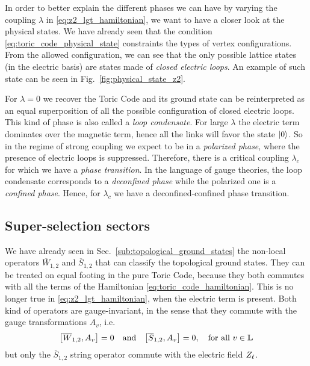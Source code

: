 In order to better explain the different phases we can have by varying the coupling $\lambda$ in \eqref{eq:z2_lgt_hamiltonian}, we want to have a closer look at the physical states.
We have already seen that the condition \eqref{eq:toric_code_physical_state} constraints the types of vertex configurations.
From the allowed configuration, we can see that the only possible lattice states (in the electric basis) are states made of \emph{closed electric loops}.
An example of such state can be seen in Fig.~\ref{fig:physical_state_z2}.


\begin{figure}[t]
\end{figure}


For $\lambda = 0$ we recover the Toric Code and its ground state can be reinterpreted as an equal superposition of all the possible configuration of closed electric loops.
This kind of phase is also called a \emph{loop condensate}.
For large $\lambda$ the electric term dominates over the magnetic term, hence all the links will favor the state $\ket{0}$.
So in the regime of strong coupling we expect to be in a \emph{polarized phase}, where the presence of electric loops is suppressed.
Therefore, there is a critical coupling $\lambda_c$ for which we have a \emph{phase transition}.
In the language of gauge theories, the loop condensate corresponds to a \emph{deconfined phase} while the polarized one is a \emph{confined phase}.
Hence, for $\lambda_c$ we have a deconfined-confined phase transition.


\subsection{Super-selection sectors}
\label{sub:super_selection_sectors}

We have already seen in Sec.~\ref{sub:topological_ground_states} the non-local operators $\overline{W}_{1,2}$ and $\overline{S}_{1,2}$ that can classify the topological ground states.
They can be treated on equal footing in the pure Toric Code, because they both commutes with all the terms of the Hamiltonian \eqref{eq:toric_code_hamiltonian}.
This is no longer true in \eqref{eq:z2_lgt_hamiltonian}, when the electric term is present.
Both kind of operators are gauge-invariant, in the sense that they commute with the gauge transformations $A_v$, i.e.
\begin{equation}
    \comm{\overline{W}_{1,2}}{A_v} = 0
    \qand
    \comm{\overline{S}_{1,2}}{A_v} = 0,
    \quad \text{for all $v \in \lattice$}
\end{equation}
but only the $\overline{S}_{1,2}$ string operator commute with the electric field $Z_{\ell}$.

